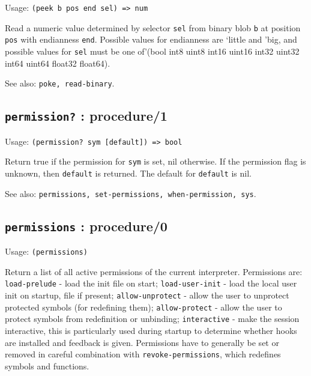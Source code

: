 \documentclass[
]{article}
\newcommand{\passthrough}[1]{#1}
\begin{document}
Usage: \passthrough{\lstinline!(peek b pos end sel) => num!}

Read a numeric value determined by selector
\passthrough{\lstinline!sel!} from binary blob
\passthrough{\lstinline!b!} at position \passthrough{\lstinline!pos!}
with endianness \passthrough{\lstinline!end!}. Possible values for
endianness are `little and 'big, and possible values for
\passthrough{\lstinline!sel!} must be one of'(bool int8 uint8 int16
uint16 int32 uint32 int64 uint64 float32 float64).

See also: \passthrough{\lstinline!poke, read-binary!}.

\hypertarget{permission-procedure1-1}{%
\subsection{\texorpdfstring{\texttt{permission?} :
procedure/1}{permission? : procedure/1}}\label{permission-procedure1-1}}

Usage: \passthrough{\lstinline!(permission? sym [default]) => bool!}

Return true if the permission for \passthrough{\lstinline!sym!} is set,
nil otherwise. If the permission flag is unknown, then
\passthrough{\lstinline!default!} is returned. The default for
\passthrough{\lstinline!default!} is nil.

See also:
\passthrough{\lstinline!permissions, set-permissions, when-permission, sys!}.

\hypertarget{permissions-procedure0-1}{%
\subsection{\texorpdfstring{\texttt{permissions} :
procedure/0}{permissions : procedure/0}}\label{permissions-procedure0-1}}

Usage: \passthrough{\lstinline!(permissions)!}

Return a list of all active permissions of the current interpreter.
Permissions are: \passthrough{\lstinline!load-prelude!} - load the init
file on start; \passthrough{\lstinline!load-user-init!} - load the local
user init on startup, file if present;
\passthrough{\lstinline!allow-unprotect!} - allow the user to unprotect
protected symbols (for redefining them);
\passthrough{\lstinline!allow-protect!} - allow the user to protect
symbols from redefinition or unbinding;
\passthrough{\lstinline!interactive!} - make the session interactive,
this is particularly used during startup to determine whether hooks are
installed and feedback is given. Permissions have to generally be set or
removed in careful combination with
\passthrough{\lstinline!revoke-permissions!}, which redefines symbols
and functions.
\end{document}

